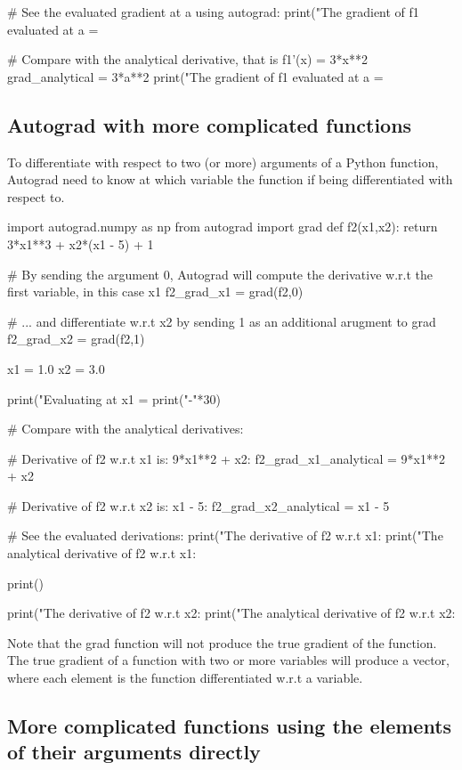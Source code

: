 \documentclass[%
oneside,                 %
final,                   %
10pt]{article}
\begin{document}
# See the evaluated gradient at a using autograd:
print("The gradient of f1 evaluated at a = %

# Compare with the analytical derivative, that is f1'(x) = 3*x**2 
grad_analytical = 3*a**2
print("The gradient of f1 evaluated at a = %
\epycod


\subsection{Autograd with more complicated functions}

To differentiate with respect to two (or more) arguments of a Python
function, Autograd need to know at which variable the function if
being differentiated with respect to.

\bpycod
import autograd.numpy as np
from autograd import grad
def f2(x1,x2):
    return 3*x1**3 + x2*(x1 - 5) + 1

# By sending the argument 0, Autograd will compute the derivative w.r.t the first variable, in this case x1
f2_grad_x1 = grad(f2,0)

# ... and differentiate w.r.t x2 by sending 1 as an additional arugment to grad
f2_grad_x2 = grad(f2,1)

x1 = 1.0
x2 = 3.0 

print("Evaluating at x1 = %
print("-"*30)

# Compare with the analytical derivatives:

# Derivative of f2 w.r.t x1 is: 9*x1**2 + x2:
f2_grad_x1_analytical = 9*x1**2 + x2

# Derivative of f2 w.r.t x2 is: x1 - 5:
f2_grad_x2_analytical = x1 - 5

# See the evaluated derivations:
print("The derivative of f2 w.r.t x1: %
print("The analytical derivative of f2 w.r.t x1: %

print()

print("The derivative of f2 w.r.t x2: %
print("The analytical derivative of f2 w.r.t x2: %
\epycod

Note that the grad function will not produce the true gradient of the function. The true gradient of a function with two or more variables will produce a vector, where each element is the function differentiated w.r.t a variable.


\subsection{More complicated functions using the elements of their arguments directly}
\end{document}
